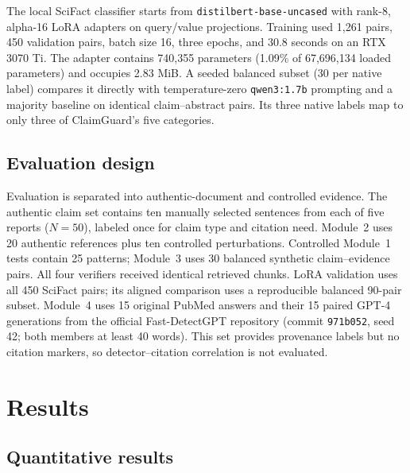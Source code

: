 \documentclass[12pt,toc=bib,toc=listof]{scrartcl}
\begin{document}
The local SciFact classifier starts from \texttt{distilbert-base-uncased} with rank-8, alpha-16 LoRA adapters on query/value projections. Training used 1,261 pairs, 450 validation pairs, batch size 16, three epochs, and 30.8 seconds on an RTX 3070 Ti. The adapter contains 740,355 parameters (1.09\% of 67,696,134 loaded parameters) and occupies 2.83 MiB. A seeded balanced subset (30 per native label) compares it directly with temperature-zero \texttt{qwen3:1.7b} prompting and a majority baseline on identical claim--abstract pairs. Its three native labels map to only three of ClaimGuard's five categories.

\subsection{Evaluation design}

Evaluation is separated into authentic-document and controlled evidence. The authentic claim set contains ten manually selected sentences from each of five reports ($N=50$), labeled once for claim type and citation need. Module~2 uses 20 authentic references plus ten controlled perturbations. Controlled Module~1 tests contain 25 patterns; Module~3 uses 30 balanced synthetic claim--evidence pairs. All four verifiers received identical retrieved chunks. LoRA validation uses all 450 SciFact pairs; its aligned comparison uses a reproducible balanced 90-pair subset. Module~4 uses 15 original PubMed answers and their 15 paired GPT-4 generations from the official Fast-DetectGPT repository (commit \texttt{971b052}, seed 42; both members at least 40 words). This set provides provenance labels but no citation markers, so detector--citation correlation is not evaluated.

\section{Results}

\subsection{Quantitative results}
\end{document}

